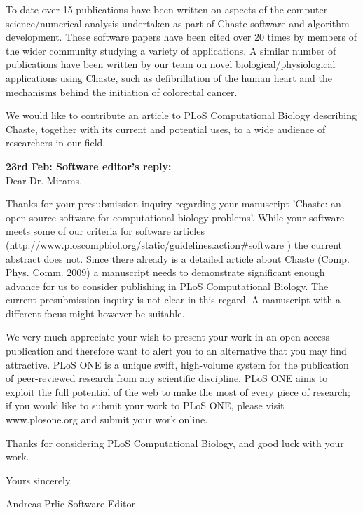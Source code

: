 \documentclass{oxcsletter}
\begin{document}
\begin{letter}{}
To date over 15 publications have been written on aspects of the computer science/numerical analysis undertaken as part of Chaste software and algorithm development. 
These software papers have been cited over 20 times by members of the wider community studying a variety of applications.
A similar number of publications have been written by our team on novel biological/physiological applications using Chaste, such as defibrillation of the human heart and the mechanisms behind the initiation of colorectal cancer.

We would like to contribute an article to PLoS Computational Biology describing Chaste, together with its current and potential uses, to a wide audience of researchers in our field.

\textbf{23rd Feb: Software editor's reply:}\\
Dear Dr. Mirams,

Thanks for your presubmission inquiry regarding your manuscript 'Chaste: an open-source software for computational biology problems'.  
While your software meets some of our criteria for software articles (http://www.ploscompbiol.org/static/guidelines.action\#software ) the current abstract does not. 
Since there already is a detailed article about Chaste (Comp. Phys. Comm. 2009) a manuscript needs to demonstrate significant enough advance for us to consider publishing in PLoS Computational Biology. 
The current presubmission inquiry is not clear in this regard. 
A manuscript with a different focus might however be suitable.

We very much appreciate your wish to present your work in an open-access publication and therefore want to alert you to an alternative that you may find attractive. 
PLoS ONE is a unique swift, high-volume system for the publication of peer-reviewed research from any scientific discipline.  
PLoS ONE aims to exploit the full potential of the web to make the most of every piece of research; 
if you would like to submit your work to PLoS ONE, please visit www.plosone.org and submit your work online.

Thanks for considering PLoS Computational Biology, and good luck with your work.

Yours sincerely,

Andreas Prlic
Software Editor
\end{letter}
\end{document}
